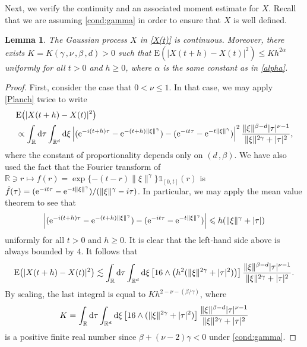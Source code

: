 \documentclass[reqno]{amsart}
\newcommand{\<}{\langle}
\renewcommand{\>}{\rangle}
\newcommand{\R}{\mathbb{R}}
\newcommand{\E}{\mathrm{E}}
\newcommand{\1}{\mathbb{1}}
\renewcommand{\d}{{\rm d}}
\newcommand{\e}{{\rm e}}
\renewcommand{\ge}{\geqslant}
\renewcommand{\le}{\leqslant}
\newtheorem{lemma}[stat]{Lemma}
\theoremstyle{definition}
\numberwithin{equation}{section}
\begin{document}
Next, we verify the continuity and an associated moment estimate for $X$.
Recall that we are assuming \eqref{cond:gamma} in order to ensure
that $X$ is well defined.


\begin{lemma}\label{lem:X:cont}
	The Gaussian process $X$ in \eqref{X(t)}
	is continuous. Moreover, there exists $K=K(\gamma\,,\nu\,,\beta\,,d)>0$
	such that $\E\left(|X(t+h)-X(t)|^2\right) \le Kh^{2\alpha}$ uniformly for all $t>0$ and $h\ge0$, where $\alpha$ is the same constant as in \eqref{alpha}.
\end{lemma}

\begin{proof}
First, consider the case that $0<\nu \le 1$.
In that case, we may apply \eqref{Planch} twice to write
\begin{align*}
	&\E\big(|X(t+h)-X(t)|^2\big)\\
	&\propto \int_{\R} \d \tau \int_{\R^d} \d \xi \left| (\e^{-i(t+h)\tau}-\e^{-(t+h)\|\xi\|^\gamma}) - (\e^{-it\tau}-\e^{-t\|\xi\|^\gamma}) \right|^2 \frac{\|\xi\|^{\beta-d}|\tau|^{\nu-1}}{\|\xi\|^{2\gamma}+|\tau|^2},
\end{align*}
where the constant of proportionality depends only on $(d\,,\beta)$. 
We have also used the fact that the Fourier transform of 
$\R\ni r\mapsto f(r) = \exp\{-(t-r) \|\xi\|^\gamma\}\1_{[0,t]}(r)$ is 
$\hat{f}(\tau)=(\e^{-it\tau}-\e^{-t\| \xi \|^{\gamma}})/(\|\xi \|^\gamma - i\tau)$.
In particular, we may apply the mean value theorem to see that
\begin{align*}
	\left| (\e^{-i(t+h)\tau}-\e^{-(t+h)\|\xi\|^\gamma}) - (\e^{-it\tau}-\e^{-t\|\xi\|^\gamma}) \right| \le h(\|\xi\|^{\gamma}+|\tau|)
\end{align*}
uniformly for all $t>0$ and $h \ge 0$.
It is clear that the left-hand side above is always bounded by $4$.
It follows that
\begin{align*}
	\E\big(|X(t+h)-X(t)|^2\big)
	\lesssim \int_{\R} \d \tau \int_{\R^d} \d \xi \left[16 \wedge \left(h^2(\|\xi\|^{2\gamma}+|\tau|^2)\right)\right] \frac{\|\xi\|^{\beta-d}|\tau|^{\nu-1}}{\|\xi\|^{2\gamma}+|\tau|^2}.
\end{align*}
By scaling, the last integral is equal to $Kh^{2-\nu-(\beta/\gamma)}$, where
\[
K = \int_{\R} \d \tau \int_{\R^d} \d \xi \left[16 \wedge (\|\xi\|^{2\gamma}+|\tau|^2)\right] \frac{\|\xi\|^{\beta-d}|\tau|^{\nu-1}}{\|\xi\|^{2\gamma}+|\tau|^2}
\]
is a positive finite real number since $\beta+(\nu-2)\gamma<0$ under \eqref{cond:gamma}.


\end{proof}
\end{document}
